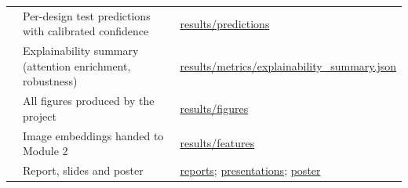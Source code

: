 \documentclass[11pt,a4paper]{article}
\begin{document}
\begin{table}[H]
\begin{tabularx}{\linewidth}{XXX}
 & Per-design test predictions with calibrated confidence & \href{https://github.com/rathiabeth-sudo/901---module-1/tree/main/results/predictions}{results/predictions} \\
 & Explainability summary (attention enrichment, robustness) & \href{https://github.com/rathiabeth-sudo/901---module-1/blob/main/results/metrics/explainability_summary.json}{results/metrics/explainability\_summary.json} \\
 & All figures produced by the project & \href{https://github.com/rathiabeth-sudo/901---module-1/tree/main/results/figures}{results/figures} \\
 & Image embeddings handed to Module 2 & \href{https://github.com/rathiabeth-sudo/901---module-1/tree/main/results/features}{results/features} \\
 & Report, slides and poster & \href{https://github.com/rathiabeth-sudo/901---module-1/tree/main/reports}{reports}; \href{https://github.com/rathiabeth-sudo/901---module-1/tree/main/presentations}{presentations}; \href{https://github.com/rathiabeth-sudo/901---module-1/tree/main/poster}{poster} \\
\bottomrule
\end{tabularx}
\end{table}
\end{document}

